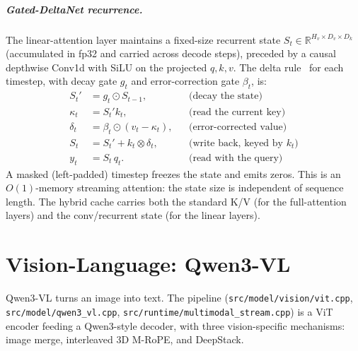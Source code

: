\documentclass[11pt,a4paper]{report}
\newcommand{\R}{\mathbb{R}}
\newcommand{\code}[1]{\texttt{#1}}
\newcommand{\elemmul}{\odot}
\begin{document}
\paragraph{Gated-DeltaNet recurrence.} The linear-attention layer maintains a
fixed-size recurrent state $S_t \in \R^{H_v\times D_v\times D_k}$ (accumulated in
fp32 and carried across decode steps), preceded by a causal depthwise Conv1d with
SiLU on the projected $q,k,v$. The delta rule~\citep{schlag2021deltanet} for each
timestep, with decay gate $g_t$ and error-correction gate $\beta_t$, is:
\begin{align}
  S_t' &= g_t \elemmul S_{t-1}, &&\text{(decay the state)}\\
  \kappa_t &= S_t' k_t, &&\text{(read the current key)}\\
  \delta_t &= \beta_t \elemmul (v_t - \kappa_t), &&\text{(error-corrected value)}\\
  S_t &= S_t' + k_t \otimes \delta_t, &&\text{(write back, keyed by } k_t)\\
  y_t &= S_t\, q_t. &&\text{(read with the query)}
\end{align}
A masked (left-padded) timestep freezes the state and emits zeros. This is an
$O(1)$-memory streaming attention: the state size is independent of sequence length.
The hybrid cache carries both the standard K/V (for the full-attention layers) and
the conv/recurrent state (for the linear layers).

\chapter{Vision-Language: Qwen3-VL}
\label{ch:vision}

Qwen3-VL turns an image into text. The pipeline (\code{src/model/vision/vit.cpp},
\code{src/model/qwen3\_vl.cpp}, \code{src/runtime/multimodal\_stream.cpp}) is a ViT
encoder feeding a Qwen3-style decoder, with three vision-specific mechanisms: image
merge, interleaved 3D M-RoPE, and DeepStack.
\end{document}
